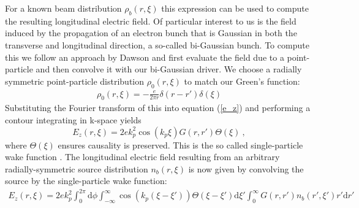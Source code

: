 For a known beam distribution $\rho_b(r,\xi)$ this expression can be used to compute the resulting longitudinal electric field. Of particular interest to us is the field induced by the propagation of an electron bunch that is Gaussian in both the transverse and longitudinal direction, a so-called bi-Gaussian bunch. To compute this we follow an approach by Dawson \cite{Katsouleas1987} and first evaluate the field due to a point-particle and then convolve it with our bi-Gaussian driver. We choose a radially symmetric point-particle distribution ${\rho}_{0}(r,\xi)$ to match our Green's function:
\begin{align}
{\rho}_{0}(r,\xi)=-\frac{e}{2\pi r}\delta(r-r')\delta(\xi) %
\end{align}
Substituting the Fourier transform of this into equation (\ref{e_z}) and performing a contour integrating in k-space yields 
\begin{equation}
E_z(r,\xi)=2ek_p^2\cos(k_p\xi)G\left(r,r'\right)\Theta(\xi)~,
\label{singe-particle-wake}
\end{equation}
where $\Theta(\xi)$ ensures causality is preserved. This is the so called single-particle wake function \cite{Katsouleas1987}. The longitudinal electric field resulting from an arbitrary radially-symmetric source distribution $n_b(r,\xi)$ is now given by convolving the source by the single-particle wake function:
\begin{align}
E_z(r,\xi)=2ek_p^2\int_0^{2\pi}\mathrm{d}\phi  \int_{-\infty}^{\infty} \cos(k_p(\xi-\xi'))\Theta(\xi-\xi')\mathrm{d}\xi' \int_{0}^{\infty}G\left(r,r'\right) n_b(r',\xi')r'\mathrm{d}r'
\end{align}
